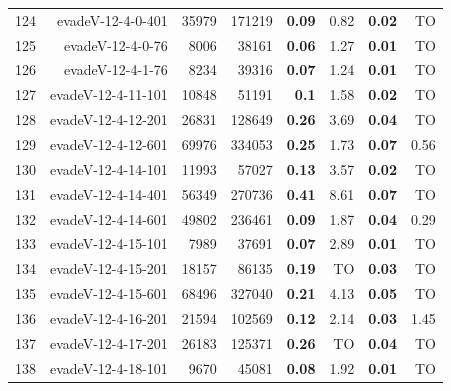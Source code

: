\begin{longtable}{lrr@{\hskip 12pt}r@{\hskip 12pt}r@{\hskip 12pt}r@{\hskip 12pt}r@{\hskip 12pt}r}
124 & \multirow{1}{*}{evadeV-12-4-0-401} & \multirow{1}{*}{35979} & \multirow{1}{*}{171219} & \textbf{0.09} & 0.82 & \textbf{0.02} & TO \\
125 & \multirow{1}{*}{evadeV-12-4-0-76} & \multirow{1}{*}{8006} & \multirow{1}{*}{38161} & \textbf{0.06} & 1.27 & \textbf{0.01} & TO \\
126 & \multirow{1}{*}{evadeV-12-4-1-76} & \multirow{1}{*}{8234} & \multirow{1}{*}{39316} & \textbf{0.07} & 1.24 & \textbf{0.01} & TO \\
127 & \multirow{1}{*}{evadeV-12-4-11-101} & \multirow{1}{*}{10848} & \multirow{1}{*}{51191} & \textbf{0.1} & 1.58 & \textbf{0.02} & TO \\
128 & \multirow{1}{*}{evadeV-12-4-12-201} & \multirow{1}{*}{26831} & \multirow{1}{*}{128649} & \textbf{0.26} & 3.69 & \textbf{0.04} & TO \\
129 & \multirow{1}{*}{evadeV-12-4-12-601} & \multirow{1}{*}{69976} & \multirow{1}{*}{334053} & \textbf{0.25} & 1.73 & \textbf{0.07} & 0.56 \\
130 & \multirow{1}{*}{evadeV-12-4-14-101} & \multirow{1}{*}{11993} & \multirow{1}{*}{57027} & \textbf{0.13} & 3.57 & \textbf{0.02} & TO \\
131 & \multirow{1}{*}{evadeV-12-4-14-401} & \multirow{1}{*}{56349} & \multirow{1}{*}{270736} & \textbf{0.41} & 8.61 & \textbf{0.07} & TO \\
132 & \multirow{1}{*}{evadeV-12-4-14-601} & \multirow{1}{*}{49802} & \multirow{1}{*}{236461} & \textbf{0.09} & 1.87 & \textbf{0.04} & 0.29 \\
133 & \multirow{1}{*}{evadeV-12-4-15-101} & \multirow{1}{*}{7989} & \multirow{1}{*}{37691} & \textbf{0.07} & 2.89 & \textbf{0.01} & TO \\
134 & \multirow{1}{*}{evadeV-12-4-15-201} & \multirow{1}{*}{18157} & \multirow{1}{*}{86135} & \textbf{0.19} & TO & \textbf{0.03} & TO \\
135 & \multirow{1}{*}{evadeV-12-4-15-601} & \multirow{1}{*}{68496} & \multirow{1}{*}{327040} & \textbf{0.21} & 4.13 & \textbf{0.05} & TO \\
136 & \multirow{1}{*}{evadeV-12-4-16-201} & \multirow{1}{*}{21594} & \multirow{1}{*}{102569} & \textbf{0.12} & 2.14 & \textbf{0.03} & 1.45 \\
137 & \multirow{1}{*}{evadeV-12-4-17-201} & \multirow{1}{*}{26183} & \multirow{1}{*}{125371} & \textbf{0.26} & TO & \textbf{0.04} & TO \\
138 & \multirow{1}{*}{evadeV-12-4-18-101} & \multirow{1}{*}{9670} & \multirow{1}{*}{45081} & \textbf{0.08} & 1.92 & \textbf{0.01} & TO \\

\end{longtable}
